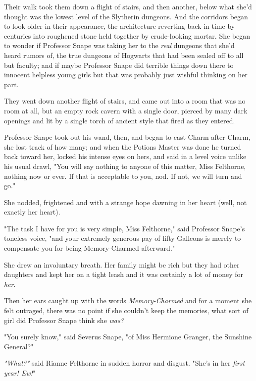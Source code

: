 Their walk took them down a flight of stairs, and then another, below what
she'd thought was the lowest level of the Slytherin dungeons. And the corridors
began to look older in their appearance, the architecture reverting back in
time by centuries into roughened stone held together by crude-looking mortar.
She began to wonder if Professor Snape was taking her to the \emph{real}
dungeons that she'd heard rumors of, the true dungeons of Hogwarts that had
been sealed off to all but faculty; and if maybe Professor Snape did terrible
things down there to innocent helpless young girls but that was probably just
wishful thinking on her part.

They went down another flight of stairs, and came out into a room that was no
room at all, but an empty rock cavern with a single door, pierced by many dark
openings and lit by a single torch of ancient style that fired as they entered.

Professor Snape took out his wand, then, and began to cast Charm after Charm,
she lost track of how many; and when the Potions Master was done he turned back
toward her, locked his intense eyes on hers, and said in a level voice unlike
his usual drawl, "You will say nothing to anyone of this matter, Miss
Felthorne, nothing now or ever. If that is acceptable to you, nod. If not, we
will turn and go."

She nodded, frightened and with a strange hope dawning in her heart (well, not
exactly her heart).

"The task I have for you is very simple, Miss Felthorne," said Professor
Snape's toneless voice, "and your extremely generous pay of fifty Galleons is
merely to compensate you for being Memory-Charmed afterward."

She drew an involuntary breath. Her family might be rich but they had other
daughters and kept her on a tight leash and it was certainly a lot of money for
\emph{her}.

Then her ears caught up with the words \emph{Memory-Charmed} and for a moment
she felt outraged, there was no point if she couldn't keep the memories, what
sort of girl did Professor Snape think she \emph{was?}

"You surely know," said Severus Snape, "of Miss Hermione Granger, the Sunshine
General?"

\emph{"What?"} said Rianne Felthorne in sudden horror and disgust. "She's in
her \emph{first year! Ew!}"
